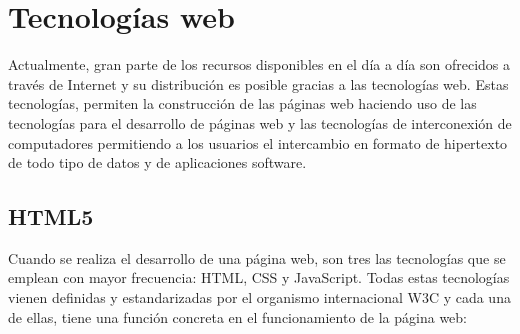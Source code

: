 \section{Tecnologías web}
\label{sec:tecnologias_web}

Actualmente, gran parte de los recursos disponibles en el día a día son ofrecidos a través de Internet y su distribución es posible gracias a las tecnologías web. Estas tecnologías, permiten la construcción de las páginas web haciendo uso de las tecnologías para el desarrollo de páginas web y las tecnologías de interconexión de computadores permitiendo a los usuarios el intercambio en formato de hipertexto de todo tipo de datos y de aplicaciones software.

\subsection{HTML5}
\label{sec:html5}

Cuando se realiza el desarrollo de una página web, son tres las tecnologías que se emplean con mayor frecuencia: HTML, CSS y JavaScript. Todas estas tecnologías vienen definidas y estandarizadas por el organismo internacional W3C y cada una de ellas, tiene una función concreta en el funcionamiento de la página web:


